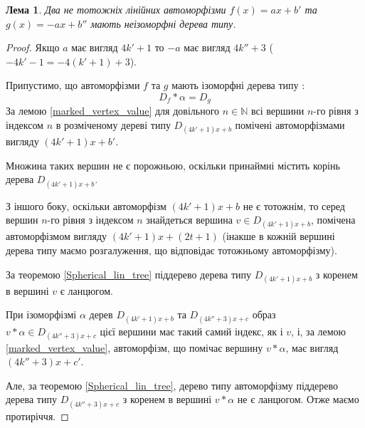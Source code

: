 \documentclass[a4paper,12pt]{article} \usepackage{a4wide}
\numberwithin{equation}{subsection}
\newtheorem{lemma}{Лема}[subsection]
\begin{document}
\begin{lemma}\label{minus_coeff_type_tree}
  Два не тотожніх лінійних автоморфізми $f(x) = ax+b'$ та $g(x) =
  -ax+b''$ мають неізоморфні дерева типу.
\end{lemma}
\begin{proof}
  Якщо $a$ має вигляд $4k'+1$ то $-a$ має вигляд $4k''+3$ ($-4k'-1 =
  -4(k'+1)+3$).

  Припустимо, що автоморфізми $f$ та $g$ мають ізоморфні дерева типу :
$$D_f*\alpha = D_g$$
За лемою \ref{marked_vertex_value} для довільного $n\in \mathbb{N}$
всі вершини $n$-го рівня з індексом $n$ в розміченому дереві типу
$D_{(4k'+1)x+b}$ помічені автоморфізмами вигляду $(4k'+1)x+b'$.

Множина таких вершин не є порожньою, оскільки принаймні містить корінь
дерева $D_{(4k'+1)x+b}$.

З іншого боку, оскільки автоморфізм $(4k'+1)x+b$ не є тотожнім, то
серед вершин $n$-го рівня з індексом $n$ знайдеться вершина $ v\in
D_{(4k'+1)x+b} $, помічена автоморфізмом вигляду $(4k'+1)x+(2t+1)$
(інакше в кожній вершині дерева типу маємо розгалуження, що відповідає
тотожньому автоморфізму).

За теоремою \ref{Spherical_lin_tree} піддерево дерева типу
$D_{(4k'+1)x+b}$ з коренем в вершині $v$ є ланцюгом.

При ізоморфізмі $\alpha$ дерев $D_{(4k'+1)x+b}$ та $D_{(4k''+3)x+c}$
образ $v*\alpha \in D_{(4k''+3)x+c} $ цієї вершини має такий самий
індекс, як і $v$, і, за лемою \ref{marked_vertex_value}, автоморфізм,
що помічає вершину $v*\alpha$, має вигляд $ (4k''+3)x+c' $.

Але, за теоремою \ref{Spherical_lin_tree}, дерево типу автоморфізму
піддерево дерева типу $D_{(4k''+3)x+c}$ з коренем в вершині $v*\alpha$
не є ланцюгом. Отже маємо протиріччя.



\end{proof}
\end{document}
